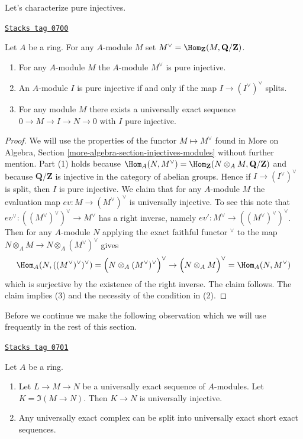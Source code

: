 Let's characterize pure injectives.

\begin{lemma}
\label{adequate-lemma-pure-injective}
\href{https://stacks.math.columbia.edu/tag/0700}{\texttt{Stacks tag 0700}}

Let $A$ be a ring. For any $A$-module $M$ set
$M^\vee = \Hom_\mathbf{Z}(M, \mathbf{Q}/\mathbf{Z})$.
\begin{enumerate}
\item For any $A$-module $M$ the $A$-module $M^\vee$ is pure injective.
\item An $A$-module $I$ is pure injective if and only if the map
$I \to (I^\vee)^\vee$ splits.
\item For any module $M$ there exists a universally exact sequence
$0 \to M \to I \to N \to 0$ with $I$ pure injective.
\end{enumerate}
\end{lemma}

\begin{proof}
We will use the properties of the functor $M \mapsto M^\vee$ found in
More on Algebra, Section \ref{more-algebra-section-injectives-modules}
without further mention. Part (1) holds because
$\Hom_A(N, M^\vee) =
\Hom_\mathbf{Z}(N \otimes_A M, \mathbf{Q}/\mathbf{Z})$
and because $\mathbf{Q}/\mathbf{Z}$ is injective in the category of
abelian groups. Hence if $I \to (I^\vee)^\vee$ is split, then
$I$ is pure injective. We claim that for any $A$-module $M$ the
evaluation map $ev : M \to (M^\vee)^\vee$ is universally injective.
To see this note that $ev^\vee : ((M^\vee)^\vee)^\vee \to M^\vee$
has a right inverse, namely $ev' : M^\vee \to ((M^\vee)^\vee)^\vee$.
Then for any $A$-module $N$ applying the exact faithful functor
${}^\vee$ to the map $N \otimes_A M \to N \otimes_A (M^\vee)^\vee$
gives
$$
\Hom_A(N, ((M^\vee)^\vee)^\vee) =
\Big(N \otimes_A (M^\vee)^\vee\Big)^\vee
\to
\Big(N \otimes_A M\Big)^\vee =
\Hom_A(N, M^\vee)
$$
which is surjective by the existence of the right inverse. The claim follows.
The claim implies (3) and the necessity of the condition in (2).
\end{proof}

Before we continue we make the following observation which we will
use frequently in the rest of this section.

\begin{lemma}
\label{adequate-lemma-split-universally-exact-sequence}
\href{https://stacks.math.columbia.edu/tag/0701}{\texttt{Stacks tag 0701}}

Let $A$ be a ring.
\begin{enumerate}
\item Let $L \to M \to N$ be a universally exact sequence
of $A$-modules. Let $K = \Im(M \to N)$.
Then $K \to N$ is universally injective.
\item Any universally exact complex
can be split into universally exact short exact sequences.
\end{enumerate}
\end{lemma}

